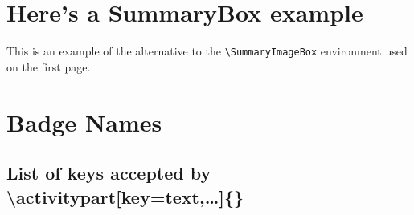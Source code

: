\documentclass[a4paper]{GreyWolfsScoutActivityTemplate}
\begin{document}
\section*{Here's a SummaryBox example}
\begin{SummaryBox}
This is an example of the alternative to the {\tt \textbackslash{}SummaryImageBox} environment used on the first page.
\par \lipsum[1]
\SummaryBoxSep
\fleur[width=\textwidth,colour=ScoutPurple]
\par
\vspace{5mm}
\lipsum[2]
\end{SummaryBox}
\clearpage



\section{Badge Names}
\label{badges}
\subsection*{List of keys accepted by \textbackslash{}activitypart[key=text,\ldots]\{\}}
\vspace{-5mm}
\begin{multicols}{2}
\footnotesize
\badgelist
\end{multicols}
\end{document}
